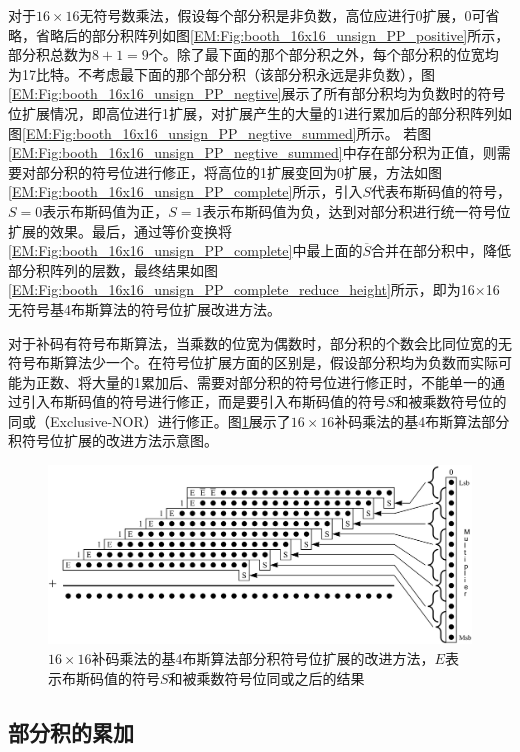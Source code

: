 对于$16\times16$无符号数乘法，假设每个部分积是非负数，高位应进行0扩展，0可省略，省略后的部分积阵列如图\ref{EM:Fig:booth_16x16_unsign_PP_positive}所示，部分积总数为$8+1 = 9$个。除了最下面的那个部分积之外，每个部分积的位宽均为17比特。不考虑最下面的那个部分积（该部分积永远是非负数），图\ref{EM:Fig:booth_16x16_unsign_PP_negtive}展示了所有部分积均为负数时的符号位扩展情况，即高位进行1扩展，对扩展产生的大量的1进行累加后的部分积阵列如图\ref{EM:Fig:booth_16x16_unsign_PP_negtive_summed}所示。
若图\ref{EM:Fig:booth_16x16_unsign_PP_negtive_summed}中存在部分积为正值，则需要对部分积的符号位进行修正，将高位的1扩展变回为0扩展，方法如图\ref{EM:Fig:booth_16x16_unsign_PP_complete}所示，引入$S$代表布斯码值的符号，$S=0$表示布斯码值为正，$S=1$表示布斯码值为负，达到对部分积进行统一符号位扩展的效果。最后，通过等价变换将\ref{EM:Fig:booth_16x16_unsign_PP_complete}中最上面的$\overline{S}$合并在部分积中，降低部分积阵列的层数，最终结果如图\ref{EM:Fig:booth_16x16_unsign_PP_complete_reduce_height}所示，即为16$\times$16无符号基4布斯算法的符号位扩展改进方法。

对于补码有符号布斯算法，当乘数的位宽为偶数时，部分积的个数会比同位宽的无符号布斯算法少一个。在符号位扩展方面的区别是，假设部分积均为负数而实际可能为正数、将大量的1累加后、需要对部分积的符号位进行修正时，不能单一的通过引入布斯码值的符号进行修正，而是要引入布斯码值的符号$S$和被乘数符号位的同或（Exclusive-NOR）进行修正。图\ref{EM:Fig:booth_16x16_signed_PP}展示了$16\times16$补码乘法的基4布斯算法部分积符号位扩展的改进方法示意图。
\begin{figure}[!htb]
    \centering
    \includegraphics[width=\textwidth]{figs/EM-Fig-booth_signed.png}
    \caption{$16 \times 16$补码乘法的基4布斯算法部分积符号位扩展的改进方法，$E$表示布斯码值的符号$S$和被乘数符号位同或之后的结果}
    \label{EM:Fig:booth_16x16_signed_PP}
\end{figure}

\subsection{部分积的累加}

